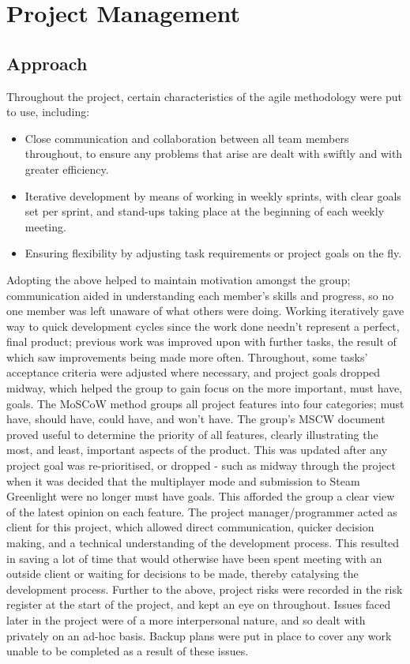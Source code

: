 \documentclass[12pt]{article}
\begin{document}
\section{Project Management}

\subsection{Approach}
Throughout the project, certain characteristics of the agile methodology were put to use, including:
\begin{itemize}
	\item Close communication and collaboration between all team members throughout, to ensure any problems that arise are dealt with swiftly and with greater efficiency.
	\item Iterative development by means of working in weekly sprints, with clear goals set per sprint, and stand-ups taking place at the beginning of each weekly meeting.
	\item Ensuring flexibility by adjusting task requirements or project goals on the fly. 
\end{itemize}
Adopting the above helped to maintain motivation amongst the group; communication aided in understanding each member's skills and progress, so no one member was left unaware of what others were doing. Working iteratively gave way to quick development cycles since the work done needn't represent a perfect, final product; previous work was improved upon with further tasks, the result of which saw improvements being made more often. Throughout, some tasks' acceptance criteria were adjusted where necessary, and project goals dropped midway, which helped the group to gain focus on the more important, must have, goals.  
\newline
\newline
The MoSCoW method groups all project features into four categories; must have, should have, could have, and won't have. The group's MSCW document proved useful to determine the priority of all features, clearly illustrating the most, and least, important aspects of the product. This was updated after any project goal was re-prioritised, or dropped - such as midway through the project when it was decided that the multiplayer mode and submission to Steam Greenlight were no longer must have goals. This afforded the group a clear view of the latest opinion on each feature. 
\newline
\newline
The project manager/programmer acted as client for this project, which allowed direct communication, quicker decision making, and a technical understanding of the development process. This resulted in saving a lot of time that would otherwise have been spent meeting with an outside client or waiting for decisions to be made, thereby catalysing the development process.
\newline 
\newline
Further to the above, project risks were recorded in the risk register at the start of the project, and kept an eye on throughout. Issues faced later in the project were of a more interpersonal nature, and so dealt with privately on an ad-hoc basis. Backup plans were put in place to cover any work unable to be completed as a result of these issues. 
\end{document}
